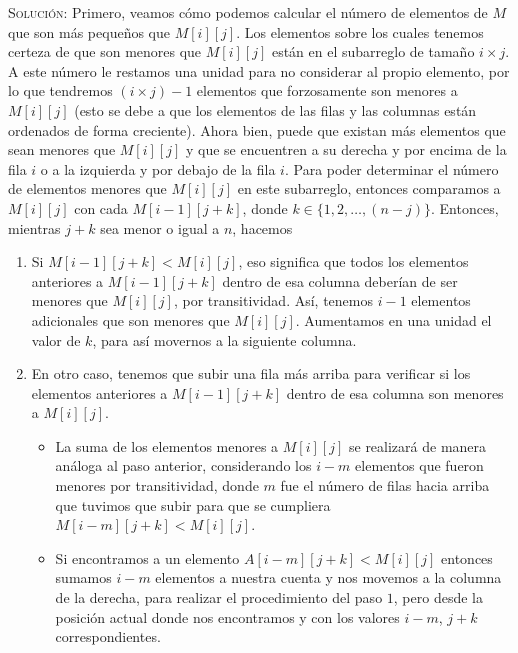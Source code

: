 \documentclass[letterpaper,11pt]{article}
\begin{document}
\begin{enumerate}
\begin{enumerate}
        \textsc{Solución:} Primero, veamos cómo podemos calcular el número de 
        elementos de $M$ que son más pequeños que $M[i][j]$. Los elementos sobre 
        los cuales tenemos certeza de que son menores que $M[i][j]$ están en el 
        subarreglo de tamaño $i \times j$. A este número le restamos una unidad 
        para no considerar al propio elemento, por lo que tendremos $(i \times j) - 1$
        elementos que forzosamente son menores a $M[i][j]$ (esto se debe a que 
        los elementos de las filas y las columnas están ordenados de forma 
        creciente). Ahora bien, puede que existan más elementos que sean menores 
        que $M[i][j]$ y que se encuentren a su derecha y por encima de la fila 
        $i$ o a la izquierda y por debajo de la fila $i$. Para poder determinar 
        el número de elementos menores que $M[i][j]$ en este subarreglo, entonces 
        comparamos a $M[i][j]$ con cada $M[i-1][j+k]$, donde 
        $k \in \{1, 2, \ldots, (n-j)\}$. Entonces, mientras $j+k$ sea menor o 
        igual a $n$, hacemos 
        \begin{enumerate}
            \item Si $M[i-1][j+k] < M[i][j]$, eso significa que todos los 
            elementos anteriores a $M[i-1][j+k]$ dentro de esa columna deberían 
            de ser menores que $M[i][j]$, por transitividad. Así, tenemos $i-1$ 
            elementos adicionales que son menores que $M[i][j]$. Aumentamos en 
            una unidad el valor de $k$, para así movernos a la siguiente columna.

            \item En otro caso, tenemos que subir una fila más arriba para 
            verificar si los elementos anteriores a $M[i-1][j+k]$ dentro de esa
            columna son menores a $M[i][j]$.
            \begin{itemize}
                \item La suma de los elementos menores a $M[i][j]$ se realizará 
                de manera análoga al paso anterior, considerando los $i-m$ 
                elementos que fueron menores por transitividad, donde $m$ fue 
                el número de filas hacia arriba que tuvimos que subir para que 
                se cumpliera $M[i-m][j+k] < M[i][j]$.

                \item Si encontramos a un elemento $A[i-m][j+k] < M[i][j]$
                entonces sumamos $i-m$ elementos a nuestra cuenta y nos 
                movemos a la columna de la derecha, para realizar el 
                procedimiento del paso $1$, pero desde la posición actual donde
                nos encontramos y con los valores $i-m$, $j+k$ correspondientes.


\end{itemize}
\end{enumerate}
\end{enumerate}
\end{enumerate}
\end{document}
